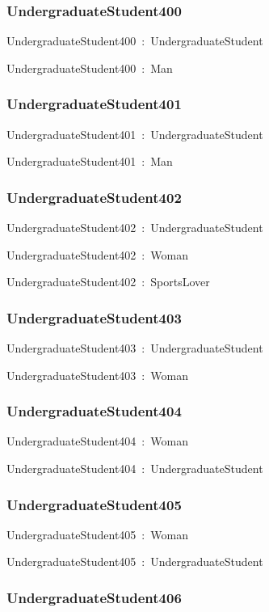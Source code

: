 \documentclass{article}
\begin{document}
\subsubsection*{UndergraduateStudent400}

UndergraduateStudent400~:~UndergraduateStudent

UndergraduateStudent400~:~Man

\subsubsection*{UndergraduateStudent401}

UndergraduateStudent401~:~UndergraduateStudent

UndergraduateStudent401~:~Man

\subsubsection*{UndergraduateStudent402}

UndergraduateStudent402~:~UndergraduateStudent

UndergraduateStudent402~:~Woman

UndergraduateStudent402~:~SportsLover

\subsubsection*{UndergraduateStudent403}

UndergraduateStudent403~:~UndergraduateStudent

UndergraduateStudent403~:~Woman

\subsubsection*{UndergraduateStudent404}

UndergraduateStudent404~:~Woman

UndergraduateStudent404~:~UndergraduateStudent

\subsubsection*{UndergraduateStudent405}

UndergraduateStudent405~:~Woman

UndergraduateStudent405~:~UndergraduateStudent

\subsubsection*{UndergraduateStudent406}
\end{document}
